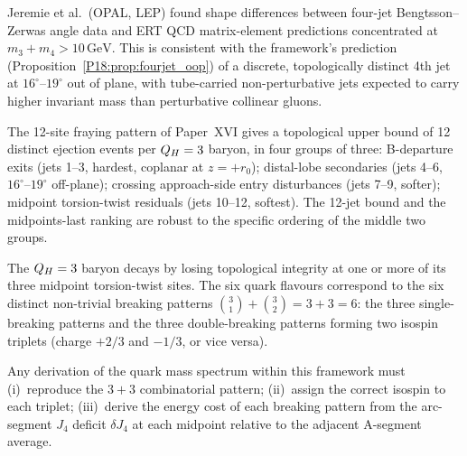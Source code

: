 \begin{remark}
\label{P18:rem:jeremie}
Jeremie et al.\ (OPAL, LEP) found shape differences between
four-jet Bengtsson--Zerwas angle data and ERT QCD matrix-element
predictions concentrated at $m_3+m_4>10\,\mathrm{GeV}$. This is
consistent with the framework's prediction
(Proposition~\ref{P18:prop:fourjet_oop}) of a discrete, topologically
distinct 4th jet at $16^\circ$--$19^\circ$ out of plane, with
tube-carried non-perturbative jets expected to carry higher
invariant mass than perturbative collinear gluons.
\end{remark}

\begin{proposition}
\label{P18:prop:jet_bound}
The 12-site fraying pattern of Paper~XVI gives a topological upper
bound of 12 distinct ejection events per $Q_H=3$ baryon, in four
groups of three: B-departure exits (jets 1--3, hardest, coplanar at
$z=+r_0$); distal-lobe secondaries (jets 4--6,
$16^\circ$--$19^\circ$ off-plane); crossing approach-side entry
disturbances (jets 7--9, softer); midpoint torsion-twist residuals
(jets 10--12, softest). The 12-jet bound and the midpoints-last
ranking are robust to the specific ordering of the middle two
groups.
\end{proposition}

\begin{conjecture}
\label{P18:conj:six_quarks}
The $Q_H=3$ baryon decays by losing topological integrity at one or
more of its three midpoint torsion-twist sites. The six quark
flavours correspond to the six distinct non-trivial breaking
patterns $\binom{3}{1}+\binom{3}{2}=3+3=6$: the three single-breaking
patterns and the three double-breaking patterns forming two isospin
triplets (charge $+2/3$ and $-1/3$, or vice versa).
\end{conjecture}

\begin{remark}
\label{P18:rem:quark_constraint}
Any derivation of the quark mass spectrum within this framework must
(i)~reproduce the $3+3$ combinatorial pattern; (ii)~assign the
correct isospin to each triplet; (iii)~derive the energy cost of
each breaking pattern from the arc-segment $J_4$ deficit $\delta J_4$
at each midpoint relative to the adjacent A-segment average.
\end{remark}

